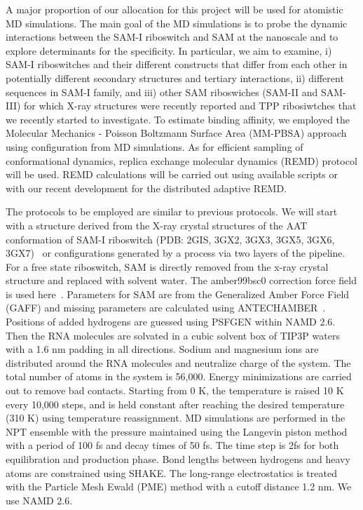 \documentclass[a4paper,10pt]{article}
\begin{document}
A major proportion of our allocation for this project will be used for atomistic MD simulations.  The main goal of the MD simulations is to probe the dynamic interactions between the SAM-I riboswitch and SAM at the nanoscale and to explore determinants for the specificity. In particular, we aim to examine, i) SAM-I riboswitches and their different constructs that differ from each other in potentially different secondary structures and tertiary interactions, ii) different sequences in SAM-I family, and iii) other SAM riboswiches (SAM-II and SAM-III) for which X-ray structures were recently reported and TPP ribosiwtches that we recently started to investigate.  To estimate binding affinity, we employed the Molecular Mechanics - Poisson Boltzmann Surface Area (MM-PBSA) approach using configuration from MD simulations.  As for efficient sampling of conformational dynamics, replica exchange molecular dynamics (REMD) protocol will be used.  REMD calculations will be carried out using available scripts or with our recent development for the distributed adaptive REMD.  

The protocols to be employed are similar to previous protocols.  We will start with a structure derived from the X-ray crystal structures of the AAT conformation of SAM-I riboswitch (PDB: 2GIS, 3GX2, 3GX3, 3GX5, 3GX6, 3GX7)~\cite{montange} or configurations generated by a process via two layers of the pipeline. For a free state riboswitch, SAM is directly removed from the x-ray crystal structure and replaced with solvent water. The amber99bsc0 correction force field is used here~\cite{alberto}. Parameters for SAM are from the Generalized Amber Force Field (GAFF) and missing parameters are calculated using ANTECHAMBER~\cite{wang}. Positions of added hydrogens are guessed using PSFGEN within NAMD 2.6. Then the RNA molecules are solvated in a cubic solvent box of TIP3P waters with a 1.6 nm padding in all directions. Sodium and magnesium ions are distributed around the RNA molecules and neutralize charge of the system. The total number of atoms in the system is 56,000. Energy minimizations are carried out to remove bad contacts. Starting from 0 K, the temperature is raised 10 K every 10,000 steps, and is held constant after reaching the desired temperature (310 K) using temperature reassignment. MD simulations are performed in the NPT ensemble with the pressure maintained using the Langevin piston method with a period of 100 fs and decay times of 50 fs. The time step is 2fs for both equilibration and production phase. Bond lengths between hydrogens and heavy atoms are constrained using SHAKE. The long-range electrostatics is treated with the Particle Mesh Ewald (PME) method with a cutoff distance 1.2 nm.  We use NAMD 2.6.
\end{document}
